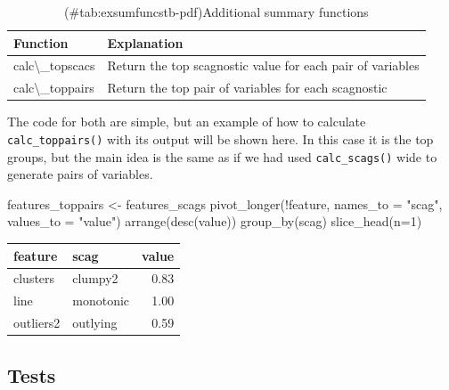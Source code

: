 \begin{Schunk}
\begin{table}

\caption{(\#tab:exsumfuncstb-pdf)Additional summary functions}
\centering
\begin{tabular}[t]{>{\raggedright\arraybackslash}p{3cm}l}
\toprule
Function & Explanation\\
\midrule
calc\textbackslash{}\_topscacs & Return the top scagnostic value for each pair of variables\\
calc\textbackslash{}\_toppairs & Return the top pair of variables for each scagnostic\\
\bottomrule
\end{tabular}
\end{table}

\end{Schunk}

The code for both are simple, but an example of how to calculate
\texttt{calc\_toppairs()} with its output will be shown here. In this
case it is the top groups, but the main idea is the same as if we had
used \texttt{calc\_scags()} wide to generate pairs of variables.

\begin{Schunk}
\begin{Sinput}
features_toppairs <- features_scags %
  pivot_longer(!feature, names_to = "scag", values_to = "value") %
  arrange(desc(value)) %
  group_by(scag) %
  slice_head(n=1)
\end{Sinput}
\end{Schunk}

\begin{Schunk}

\begin{tabular}{>{\raggedright\arraybackslash}p{3cm}lr}
\toprule
feature & scag & value\\
\midrule
clusters & clumpy2 & 0.83\\
line & monotonic & 1.00\\
outliers2 & outlying & 0.59\\
\bottomrule
\end{tabular}

\end{Schunk}

\hypertarget{tests}{%
\subsection{Tests}\label{tests}}


